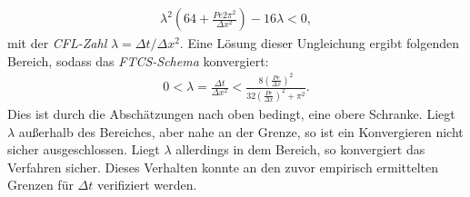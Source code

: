 \documentclass[12pt,a4paper,titlepage,headinclude,bibtotoc]{scrartcl}
\begin{document}
\begin{align}
\lambda^2 \left(64 + \frac{Pe 2 \pi^2}{\Delta x^2} \right) -16 \lambda <0,
\end{align}
mit der \textit{CFL-Zahl} $\lambda = \Delta t/\Delta x^2$.
Eine Lösung dieser Ungleichung ergibt folgenden Bereich, sodass das \textit{FTCS-Schema} konvergiert:
\begin{align}
0 < \lambda = \frac{\Delta t}{\Delta x^2} < \frac{8 \left(\frac{Pe}{\Delta x}\right)^2}{32\left(\frac{Pe}{\Delta x}\right)^2 + \pi^2}.
\end{align}
Dies ist durch die Abschätzungen nach oben bedingt, eine obere Schranke. Liegt $\lambda$ außerhalb des Bereiches, aber nahe an der Grenze, so ist ein Konvergieren nicht sicher ausgeschlossen. Liegt $\lambda$ allerdings in dem Bereich, so konvergiert das Verfahren sicher. Dieses Verhalten konnte an den zuvor empirisch ermittelten Grenzen für $\Delta t$ verifiziert werden.
\end{document}
